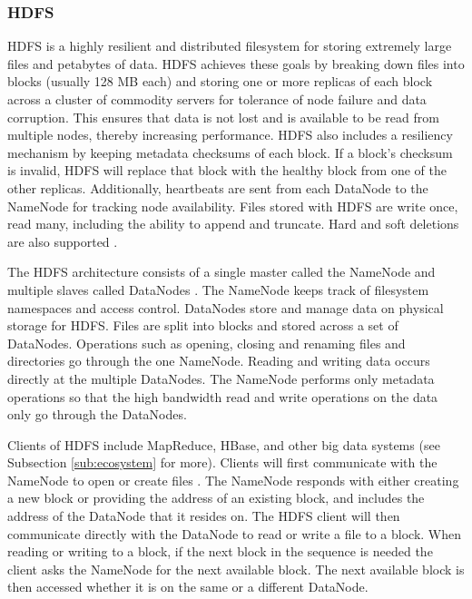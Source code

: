\documentclass[12pt]{article}
\begin{document}
\subsubsection{HDFS}

HDFS \cite{hdfs} is a highly resilient and distributed filesystem for storing extremely large files and petabytes of data. HDFS achieves these goals by breaking down files into blocks (usually 128 MB each) and storing one or more replicas of each block across a cluster of commodity servers for tolerance of node failure and data corruption. This ensures that data is not lost and is available to be read from multiple nodes, thereby increasing performance. HDFS also includes a resiliency mechanism by keeping metadata checksums of each block. If a block's checksum is invalid, HDFS will replace that block with the healthy block from one of the other replicas. Additionally, heartbeats are sent from each DataNode to the NameNode for tracking node availability. Files stored with HDFS are write once, read many, including the ability to append and truncate. Hard and soft deletions are also supported \cite{singh2015survey}.

The HDFS architecture consists of a single master called the NameNode and multiple slaves called DataNodes \cite{hdfsarchitecture}. The NameNode keeps track of filesystem namespaces and access control. DataNodes store and manage data on physical storage for HDFS. Files are split into blocks and stored across a set of DataNodes. Operations such as opening, closing and renaming files and directories go through the one NameNode. Reading and writing data occurs directly at the multiple DataNodes. The NameNode performs only metadata operations so that the high bandwidth read and write operations on the data only go through the DataNodes.

Clients of HDFS include MapReduce, HBase, and other big data systems (see Subsection \ref{sub:ecosystem} for more). Clients will first communicate with the NameNode to open or create files \cite{hdfsarchitecture}. The NameNode responds with either creating a new block or providing the address of an existing block, and includes the address of the DataNode that it resides on. The HDFS client will then communicate directly with the DataNode to read or write a file to a block. When reading or writing to a block, if the next block in the sequence is needed the client asks the NameNode for the next available block. The next available block is then accessed whether it is on the same or a different DataNode.
\end{document}
